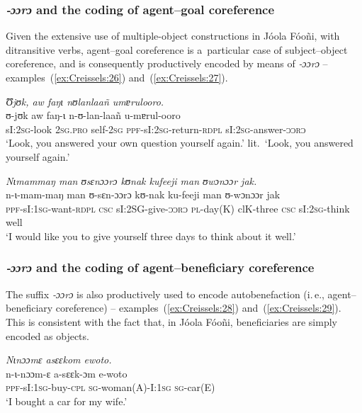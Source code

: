 \documentclass[output=paper]{langscibook}
\begin{document}
\subsubsection{\textit{‑ɔɔrɔ} and the coding of agent--goal coreference}%
\label{sec:Creissels:ooro-agent-goal}

Given the extensive use of multiple-object constructions in Jóola Fóoñi, with
ditransitive verbs, agent--goal coreference is a~particular case of
subject--object coreference, and is consequently productively encoded by means
of \textit{‑ɔɔrɔ} -- examples~(\ref{ex:Creissels:26}) and~(\ref{ex:Creissels:27}).

\ea
  \label{ex:Creissels:26}
    \textit{Ʊjʊk, aw faŋɩ nʊlanlaañ umɐrulooro.}\\
    \gll ʊ-jʊk aw faŋ-ɩ n-ʊ-lan-laañ u-mɐrul-ooro\\
    sI:\textsc{2sg}-look \textsc{2sg.pro} self-\textsc{2sg} \textsc{ppf}-sI:\textsc{2sg}-return-\textsc{rdpl} sI:\textsc{2sg}-answer-\textsc{ɔɔrɔ}\\
    \glt `Look, you answered your own question yourself again.'
    lit.\ `Look, you answered yourself again.'
\z

 \ea\label{ex:Creissels:27}
    \textit{Nɩmammaŋ man ʊsɛnɔɔrɔ kʊnak kufeeji man ʊwɔnɔɔr jak.}\\
    \gll n-ɩ-mam-maŋ man ʊ-sɛn-ɔɔrɔ kʊ-nak ku-feeji man ʊ-wɔnɔɔr jak\\
    \textsc{ppf}-sI:\textsc{1sg}-want-\textsc{rdpl} \textsc{csc} sI:2SG-give-\textsc{ɔɔrɔ}
    \textsc{pl}-day(K) clK-three \textsc{csc} sI:\textsc{2sg}-think well\\
    \glt `I would like you to give yourself three days to think about it well.'
\z

\subsubsection{\textit{‑ɔɔrɔ} and the coding of agent--beneficiary coreference}%
\label{sec:Creissels:ooro-agent-benef}

The suffix \textit{‑ɔɔrɔ} is also productively used to encode autobenefaction
(i.\,e., agent--beneficiary coreference) -- examples~(\ref{ex:Creissels:28})
and~(\ref{ex:Creissels:29}).  This is consistent with the fact that, in Jóola Fóoñi,
beneficiaries are simply encoded as objects.

\ea
  \label{ex:Creissels:28}
  
    \ea\label{ex:Creissels:28a}
  
      \textit{Nɩnɔɔmɛ asɛɛkom ewoto.}\\
      \gll n-ɩ-nɔɔm-ɛ a-sɛɛk-ɔm e-woto\\
      \textsc{ppf}-sI:\textsc{1sg}-buy-\textsc{cpl} \textsc{sg}-woman(A)-I:\textsc{1sg} \textsc{sg}-car(E)\\
      \glt `I bought a car for my wife.'
\end{document}
